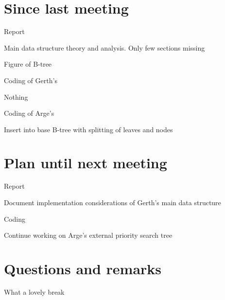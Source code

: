 \documentclass[a4paper,11pt,agenda,chair]{meetingmins}
\begin{document}
\maketitle

\section{Since last meeting}
\begin{items}
\item Report
	\begin{items}
		\item Main data structure theory and analysis. Only few sections missing
		\item Figure of B-tree
	\end{items}
\item Coding of Gerth's
	\begin{items}
		\item Nothing
	\end{items}
\item Coding of Arge's
	\begin{items}
		\item Insert into base B-tree with splitting of leaves and nodes
	\end{items}
\end{items}

\section{Plan until next meeting}
\begin{items}
\item Report
	\begin{items}
		\item Document implementation considerations of Gerth's main data structure
	\end{items}
\item Coding
	\begin{items}
		\item Continue working on Arge's external priority search tree
	\end{items}
\end{items}

\section{Questions and remarks}
\begin{items}
	\item What a lovely break
\end{items}
\end{document}
